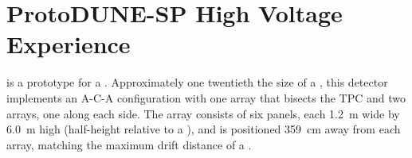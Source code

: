 \section{ProtoDUNE-SP High Voltage Experience}
\label{sec:fdsp-hv-protodune}



 \cite{Abi:2017aow} is a prototype for a . %
Approximately one twentieth the size of a , this detector implements an A-C-A configuration with one  array that bisects the TPC and two  arrays, one along each side. 
The  array consists of %
six  panels, each \SI{1.2}{m} wide by \SI{6.0}{m} high (half-height relative to a ), 
and is positioned \SI{359}{cm} away from each  array, matching the maximum drift distance of a .

